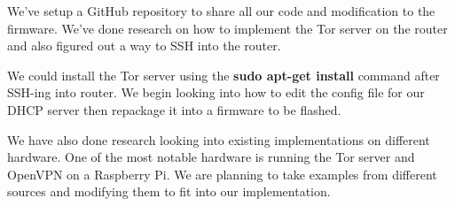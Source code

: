 \documentclass[12pt]{article}
\begin{document}
	We've setup a GitHub repository to share all our code and modification to the firmware. We've done research on how to implement the Tor server on the router and also figured out a way to SSH into the router. \newline 
	
	We could install the Tor server using the \textbf{sudo apt-get install} command after SSH-ing into router. We begin looking into how to edit the config file for our DHCP server then repackage it into a firmware to be flashed.
	
	We have also done research looking into existing implementations on different hardware. One of the most notable hardware is running the Tor server and OpenVPN on a Raspberry Pi. We are planning to take examples from different sources and modifying them to fit into our implementation. 
	
\end{document}
